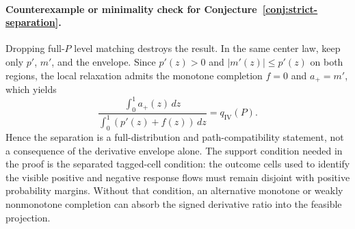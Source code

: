 \documentclass[11pt]{article}
\theoremstyle{definition}
\theoremstyle{plain}
\theoremstyle{remark}
\begin{document}
\paragraph{Counterexample or minimality check for Conjecture~\ref{conj:strict-separation}.}
Dropping full-\(P\) level matching destroys the result.  In the same center
law, keep only \(p'\), \(m'\), and the envelope.  Since \(p'(z)>0\) and
\(|m'(z)|\le p'(z)\) on both regions, the local relaxation admits the monotone
completion \(f=0\) and \(a_+=m'\), which yields
\[
\frac{\int_0^1a_+(z)\,dz}{\int_0^1(p'(z)+f(z))\,dz}
=
q_{\mathrm{IV}}(P).
\]
Hence the separation is a full-distribution and path-compatibility statement,
not a consequence of the derivative envelope alone.  The support condition
needed in the proof is the separated tagged-cell condition: the outcome cells
used to identify the visible positive and negative response flows must remain
disjoint with positive probability margins.  Without that condition, an
alternative monotone or weakly nonmonotone completion can absorb the signed
derivative ratio into the feasible projection.
\end{document}
